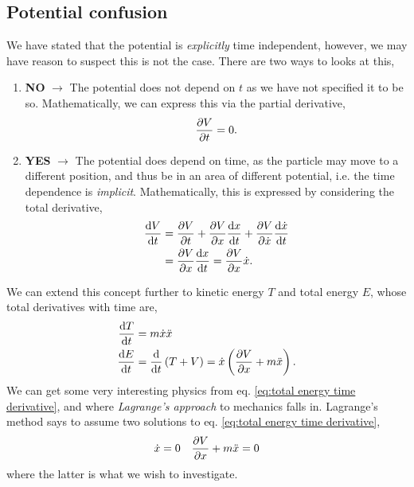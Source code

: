 \documentclass{book}
\begin{document}
\subsection{Potential confusion}
We have stated that the potential is \textit{explicitly} time independent, however, we may have reason to suspect this is not the case. There are two ways to looks at this,
\begin{enumerate}
	\item \textbf{NO} $\to$ The potential does not depend on $t$ as we have not specified it to be so. Mathematically, we can express this via the partial derivative,
	\begin{equation}
		\pdv{V}{t} = 0.
	\end{equation}
	\item \textbf{YES} $\to$ The potential does depend on time, as the particle may move to a different position, and thus be in an area of different potential, i.e. the time dependence is \textit{implicit}. Mathematically, this is expressed by considering the total derivative,
	\begin{equation}
		\begin{split}
			\dv{V}{t} &= \pdv{V}{t} + \pdv{V}{x}\dv{x}{t} + \pdv{V}{\Dot{x}}\dv{\Dot{x}}{t}\\
			& = \pdv{V}{x}\dv{x}{t} =\pdv{V}{x}\Dot{x}.
		\end{split}
	\end{equation}
\end{enumerate}
We can extend this concept further to kinetic energy $T$ and total energy $E$, whose total derivatives with time are,
\begin{align}
	\dv{T}{t} & = m\Dot{x}\Ddot{x} \\
	\dv{E}{t} & = \dv{t}\left(T + V\right) = \Dot{x}\left(\pdv{V}{x} + m\Ddot{x}\right). \label{eq:total energy time derivative}
\end{align}
We can get some very interesting physics from eq. \eqref{eq:total energy time derivative}, and where \textit{Lagrange's approach} to mechanics falls in. Lagrange's method says to assume two solutions to eq. \eqref{eq:total energy time derivative},
\begin{align}
	\Dot{x} = 0 && \pdv{V}{x} + m\Ddot{x} = 0
\end{align}
where the latter is what we wish to investigate.
\end{document}
